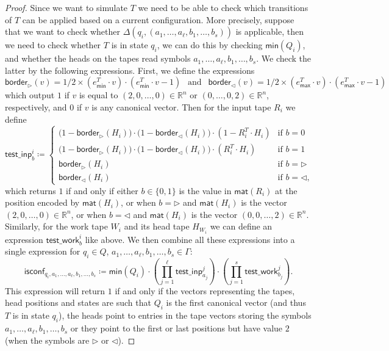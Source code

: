 \begin{proof}
Since we want to simulate $T$ we need to be able to check which 
    transitions of $T$ can be applied based on a current configuration. More precisely,
    suppose that we want to check whether $\Delta(q_i,(a_1,\ldots,a_{\ell},b_1,\ldots, b_s))$ is applicable, then we 
    need to check whether $T$ is in state $q_i$, we can do this by checking 
    $\mathsf{min}(Q_i)$, and whether the heads on the tapes read symbols $a_1,\ldots,a_{\ell},b_1, \ldots, b_s$. We 
    check the latter by the following expressions.
    First, we define the expressions 
    $$
    \mathsf{border}_{\rhd}(v) = 1/2 \times (e_{\mathsf{min}}^T \cdot v) \cdot (e_{\mathsf{min}}^T \cdot v - 1) \ \ \text{ and } \ \  \mathsf{border}_{\lhd}(v) = 1/2 \times (e_{\mathsf{max}}^T \cdot v) \cdot (e_{\mathsf{max}}^T \cdot v - 1)
    $$
    which output $1$ if $v$ is equal to $(2,0,\ldots,0)\in\mathbb{R}^n$ or $(0, \ldots, 0, 2)\in\mathbb{R}^n$, respectively, and $0$ if $v$ is any canonical vector.
    Then for the input tape $R_i$ we define
    $$
    \mathsf{test\_inp}^i_b\coloneqq \begin{cases}
    \bigl(1-\mathsf{border}_{\rhd}(H_i)\bigr)\cdot \bigl(1-\mathsf{border}_{\lhd}(H_i)\bigr)\cdot(1- R_i^T\cdot H_i) & \text{if $b=0$}\\
    \bigl(1-\mathsf{border}_{\rhd}(H_i)\bigr)\cdot \bigl(1-\mathsf{border}_{\lhd}(H_i)\bigr)\cdot(R_i^T\cdot H_i) & \text{if $b=1$}\\
    \mathsf{border}_{\rhd}(H_i) & \text{if $b=\rhd$}\\
    \mathsf{border}_{\lhd}(H_i) & \text{if $b=\lhd$},
    \end{cases}
    $$
    which returns $1$ if and only if either $b\in\{0,1\}$ is the value in $\mathsf{mat}(R_i)$ at the 
    position encoded by $\mathsf{mat}(H_i)$, or when $b=\rhd$ and $\mathsf{mat}(H_i)$ is the vector 
    $(2,0,\ldots,0)\in\mathbb{R}^n$, or when $b=\lhd$ and $\mathsf{mat}(H_i)$ is the vector 
    $(0,0,\ldots,2)\in\mathbb{R}^n$.
    Similarly, for the work tape $W_i$ and its head tape $H_{W_i}$ we can define an expression $\mathsf{test\_work}^i_b$ like above.
    We then combine all these expressions into a single expression for $q_i\in Q$, 
    $a_1,\ldots,a_\ell,b_1,\ldots, b_s\in\Gamma$:
    $$
    \mathsf{isconf}_{q_i,a_1,\ldots,a_\ell,b_1,\ldots, b_s}\coloneqq 
    \mathsf{min}(Q_i)\cdot \left(\prod_{j=1}^{\ell} \mathsf{test\_inp}_{a_j}^j\right)
    \cdot\left(\prod_{j=1}^{s} \mathsf{test\_work}_{b_j}^j\right).
    $$
    This expression will return $1$ if and only if the vectors representing the tapes, 
    head positions and states are such that $Q_i$ is the first canonical vector 
    (and thus $T$ is in state $q_i$), the heads point to entries in the tape vectors storing 
    the symbols $a_1,\ldots,a_{\ell}, b_1, \ldots, b_s$ or they point to the first or last positions but have value $2$ (when the symbols are $\rhd$ or $\lhd$). 


\end{proof}

